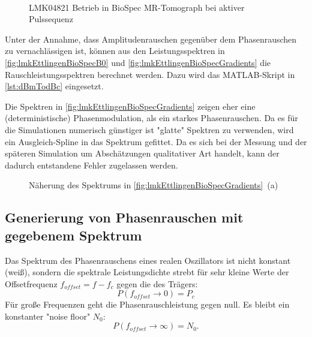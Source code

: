 \begin{figure}[H]
	\centering
	\\[4ex]
	\caption{LMK04821 Betrieb in BioSpec MR-Tomograph bei aktiver Pulssequenz}
	\label{fig:lmkEttlingenBioSpecGradients}
\end{figure}

Unter der Annahme, dass Amplitudenrauschen gegenüber dem Phasenrauschen zu vernachlässigen ist, können aus den Leistungsspektren in \autoref{fig:lmkEttlingenBioSpecB0} und \autoref{fig:lmkEttlingenBioSpecGradients} die Rauschleistungsspektren berechnet werden. Dazu wird das MATLAB-Skript in \autoref{lst:dBmTodBc} eingesetzt.


Die Spektren in \autoref{fig:lmkEttlingenBioSpecGradients} zeigen eher eine (deterministische) Phasenmodulation, als ein starkes Phasenrauschen. Da es für die Simulationen numerisch günstiger ist "glatte" Spektren zu verwenden, wird ein Ausgleich-Spline in das Spektrum gefittet. Da es sich bei der Messung und der späteren Simulation um Abschätzungen qualitativer Art handelt, kann der dadurch entstandene Fehler zugelassen werden.

\begin{figure}[H]
	\centering
	\caption[]{Näherung des Spektrums in \autoref{fig:lmkEttlingenBioSpecGradients}~(a)}
	\label{fig:lmkEttlingenBioSpecGradientsfit}
\end{figure}







\subsection{Generierung von Phasenrauschen mit gegebenem Spektrum}
Das Spektrum des Phasenrauschens eines realen Oszillators ist nicht konstant (weiß), sondern die spektrale Leistungsdichte strebt für sehr kleine Werte der Offsetfrequenz $f_{offset}=f-f_c$ gegen die des Trägers:
\begin{equation}
P(f_{offset} \rightarrow 0) = P_c
\end{equation}
Für große Frequenzen geht die Phasenrauschleistung gegen null. Es bleibt ein konstanter "noise floor" $N_0$:
\begin{equation}
P(f_{offset} \rightarrow \infty) = N_0.
\end{equation}

